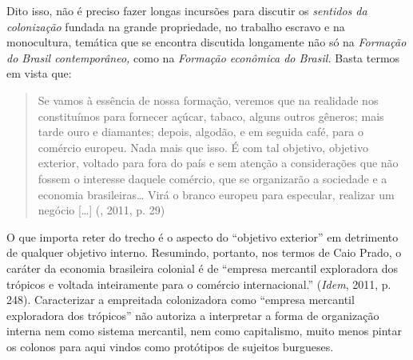 {Dito isso, não é preciso fazer longas incursões para discutir os
\emph{sentidos da colonização} fundada na grande propriedade, no
trabalho escravo e na monocultura, temática que se encontra discutida
longamente não só na \emph{Formação do Brasil contemporâneo,} como na
\emph{Formação econômica do Brasil.} Basta termos em vista que:

\begin{quote}
Se vamos à essência de nossa formação, veremos que na realidade nos
constituímos para fornecer açúcar, tabaco, alguns outros gêneros; mais
tarde ouro e diamantes; depois, algodão, e em seguida café, para o
comércio europeu. Nada mais que isso. É com tal objetivo, objetivo
exterior, voltado para fora do país e sem atenção a considerações que
não fossem o interesse daquele comércio, que se organizarão a sociedade
e a economia brasileiras\ldots{} Virá o branco europeu para especular,
realizar um negócio [\ldots{}] (, 2011, p. 29)
\end{quote}

O que importa reter do trecho é o aspecto do ``objetivo exterior'' em
detrimento de qualquer objetivo interno. Resumindo, portanto, nos termos
de Caio Prado, o caráter da economia brasileira colonial é de ``empresa
mercantil exploradora dos trópicos e voltada inteiramente para o
comércio internacional.'' (\emph{Idem}, 2011, p. 248). Caracterizar a
empreitada colonizadora como ``empresa mercantil exploradora dos
trópicos'' não autoriza a interpretar a forma de organização interna nem
como sistema mercantil, nem como capitalismo, muito menos pintar os
colonos para aqui vindos como protótipos de sujeitos burgueses.

}
